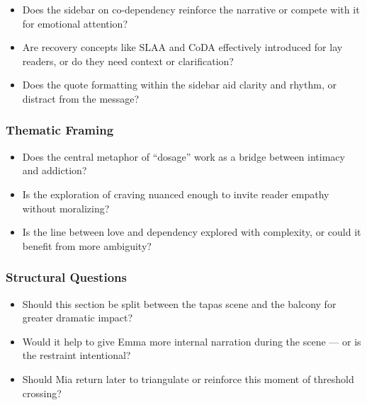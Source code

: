 \begin{itemize}
  \item Does the sidebar on co-dependency reinforce the narrative or compete with it for emotional attention?
  \item Are recovery concepts like SLAA and CoDA effectively introduced for lay readers, or do they need context or clarification?
  \item Does the quote formatting within the sidebar aid clarity and rhythm, or distract from the message?
\end{itemize}

\subsubsection*{Thematic Framing}

\begin{itemize}
  \item Does the central metaphor of ``dosage'' work as a bridge between intimacy and addiction?
  \item Is the exploration of craving nuanced enough to invite reader empathy without moralizing?
  \item Is the line between love and dependency explored with complexity, or could it benefit from more ambiguity?
\end{itemize}

\subsubsection*{Structural Questions}

\begin{itemize}
  \item Should this section be split between the tapas scene and the balcony for greater dramatic impact?
  \item Would it help to give Emma more internal narration during the scene — or is the restraint intentional?
  \item Should Mia return later to triangulate or reinforce this moment of threshold crossing?
\end{itemize}

